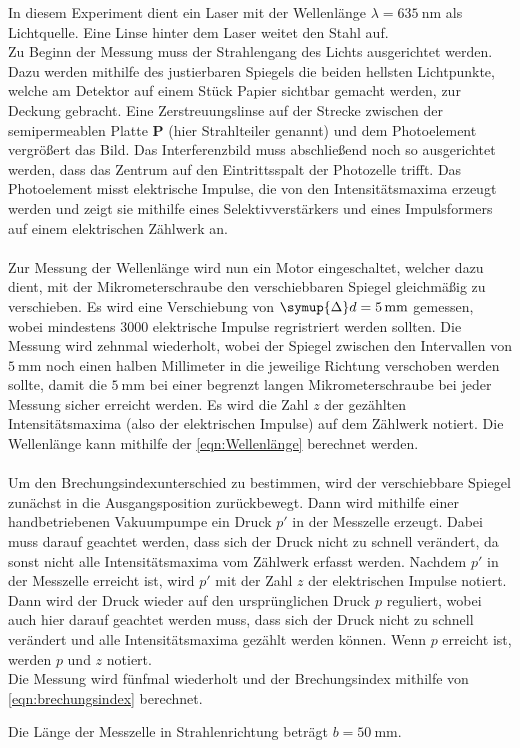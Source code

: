     In diesem Experiment dient ein Laser mit der Wellenlänge $\lambda = \SI{635}{\nano\meter}$ als Lichtquelle.
    Eine Linse hinter dem Laser weitet den Stahl auf.\\
    Zu Beginn der Messung muss der Strahlengang des Lichts ausgerichtet werden.
    Dazu werden mithilfe des justierbaren Spiegels die beiden hellsten Lichtpunkte,
    welche am Detektor auf einem Stück Papier sichtbar gemacht werden,
    zur Deckung gebracht.
    Eine Zerstreuungslinse auf der Strecke zwischen der semipermeablen Platte \textbf{P} (hier Strahlteiler genannt) und dem Photoelement vergrößert das Bild.
    Das Interferenzbild muss abschließend noch so ausgerichtet werden,
    dass das Zentrum auf den Eintrittsspalt der Photozelle trifft.
    Das Photoelement misst elektrische Impulse,
    die von den Intensitätsmaxima erzeugt werden
    und zeigt sie mithilfe eines Selektivverstärkers
    und eines Impulsformers auf einem elektrischen Zählwerk an.\\
    \\
    Zur Messung der Wellenlänge wird nun ein Motor eingeschaltet,
    welcher dazu dient,
    mit der Mikrometerschraube den verschiebbaren Spiegel gleichmäßig zu verschieben.
    Es wird eine Verschiebung von $\symup{\Delta}d = \SI{5}{\milli\meter}$ gemessen,
    wobei mindestens $3000$ elektrische Impulse regristriert werden sollten.
    Die Messung wird zehnmal wiederholt,
    wobei der Spiegel zwischen den Intervallen von $\SI{5}{\milli\meter}$ noch einen halben Millimeter in die jeweilige Richtung verschoben werden sollte,
    damit die $\SI{5}{\milli\meter}$ bei einer begrenzt langen Mikrometerschraube bei jeder Messung sicher erreicht werden.
    Es wird die Zahl $z$ der gezählten Intensitätsmaxima (also der elektrischen Impulse) auf dem Zählwerk notiert.
    Die Wellenlänge kann mithilfe der \autoref{eqn:Wellenlänge} berechnet werden.\\
    \\
    Um den Brechungsindexunterschied zu bestimmen,
    wird der verschiebbare Spiegel zunächst in die Ausgangsposition zurückbewegt.
    Dann wird mithilfe einer handbetriebenen Vakuumpumpe ein Druck $p'$ in der Messzelle erzeugt.
    Dabei muss darauf geachtet werden,
    dass sich der Druck nicht zu schnell verändert,
    da sonst nicht alle Intensitätsmaxima vom Zählwerk erfasst werden.
    Nachdem $p'$ in der Messzelle erreicht ist,
    wird $p'$ mit der Zahl $z$ der elektrischen Impulse notiert.
    Dann wird der Druck wieder auf den ursprünglichen Druck $p$ reguliert,
    wobei auch hier darauf geachtet werden muss,
    dass sich der Druck nicht zu schnell verändert und alle Intensitätsmaxima gezählt werden können.
    Wenn $p$ erreicht ist,
    werden $p$ und $z$ notiert.\\
    Die Messung wird fünfmal wiederholt und der Brechungsindex mithilfe von \autoref{eqn:brechungsindex} berechnet.

    Die Länge der Messzelle in Strahlenrichtung beträgt $b = \SI{50}{\milli\meter}$.
